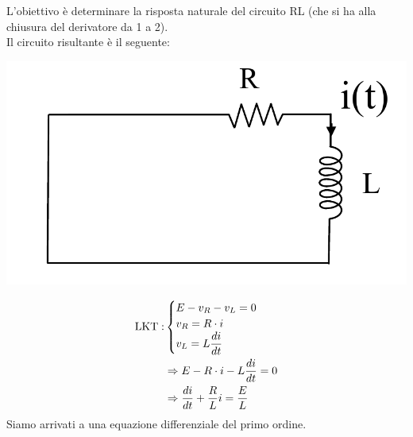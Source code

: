 \documentclass{article}
\begin{document}
L'obiettivo è determinare la risposta naturale del circuito RL (che si ha alla chiusura del derivatore da 1 a 2).\\
Il circuito risultante è il seguente:
\begin{center}
    \includegraphics[scale=0.25]{Image/RL_2.png}
\end{center}
\begin{align*}
    \text{LKT}:&
    \begin{cases}
        E-v_R-v_L = 0\\
        v_R = R \cdot i\\
        v_L=L \dfrac{di}{dt}
    \end{cases}\\
    &\Rightarrow E - R \cdot i - L \frac{di}{dt}=0\\
    &\Rightarrow \frac{di}{dt} + \frac{R}{L}i = \frac{E}{L}
\end{align*}
Siamo arrivati a una equazione differenziale del primo ordine.
\end{document}
